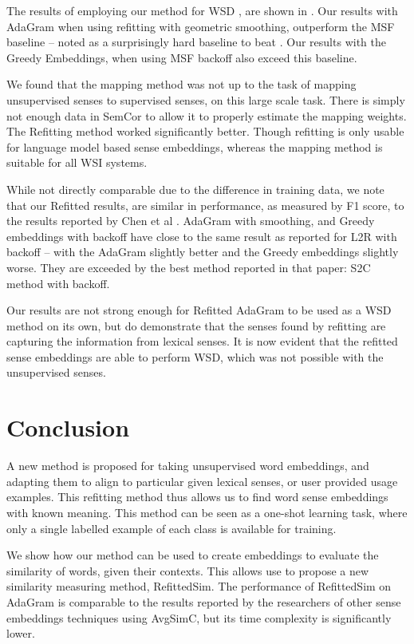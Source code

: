 \documentclass{article} %
\def\parencite{\cite} %
\begin{document}
The results of employing our method for WSD , are shown in . Our results with AdaGram when using refitting with geometric smoothing, outperform the MSF baseline -- noted as a surprisingly hard baseline to beat \parencite{Chen2014}. Our results with the Greedy Embeddings, when using MSF backoff also exceed this baseline.

We found that the mapping method \parencite{agirre2006}  was not up to the task of mapping unsupervised senses to supervised senses, on this large scale task. There is simply not enough data in SemCor to allow it to properly estimate the mapping weights. The Refitting method worked significantly better. Though refitting is only usable for language model based sense embeddings, whereas the mapping method is suitable for all WSI systems.

While not directly comparable due to the difference in training data, we note that our Refitted results, are similar in performance, as measured by F1 score, to the results reported by Chen et al \parencite{Chen2014}.
AdaGram with smoothing, and Greedy embeddings with backoff have close to the same result as reported for L2R with backoff -- with the AdaGram slightly better and the Greedy embeddings slightly worse. They are exceeded by the best method reported in that paper: S2C method with backoff.

Our results are not strong enough for Refitted AdaGram to be used as a WSD method on its own, but do demonstrate that the senses found by refitting are capturing the information from lexical senses.  It is now evident that the refitted sense embeddings are able to perform WSD, which was not possible with the unsupervised senses. 

\section{Conclusion}\label{conclusion}

A new method is proposed for taking unsupervised word embeddings, and adapting them to align to particular given lexical senses, or user provided usage examples. 
This refitting method thus allows us to find word sense embeddings with known meaning.
This method can be seen as a one-shot learning task, where only a single labelled example of each class is available for training.

We show how our method can be used to create embeddings to evaluate the similarity of words, given their contexts.
This allows use to propose a new similarity measuring method, RefittedSim.
The performance of RefittedSim on AdaGram is comparable to the results reported by the researchers of other sense embeddings techniques using AvgSimC, but its time complexity is significantly lower.
\end{document}
